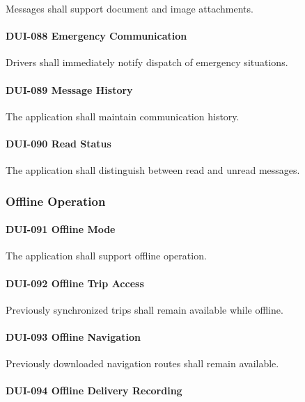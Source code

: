 Messages shall support document and image attachments.

\paragraph{DUI-088 Emergency Communication}

Drivers shall immediately notify dispatch of emergency situations.

\paragraph{DUI-089 Message History}

The application shall maintain communication history.

\paragraph{DUI-090 Read Status}

The application shall distinguish between read and unread messages.


\subsubsection*{Offline Operation}

\paragraph{DUI-091 Offline Mode}

The application shall support offline operation.

\paragraph{DUI-092 Offline Trip Access}

Previously synchronized trips shall remain available while offline.

\paragraph{DUI-093 Offline Navigation}

Previously downloaded navigation routes shall remain available.

\paragraph{DUI-094 Offline Delivery Recording}

